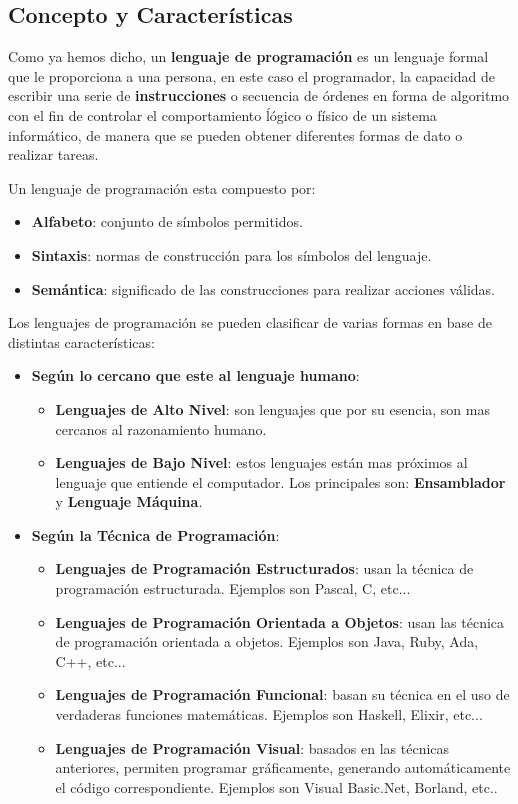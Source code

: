 \subsection{Concepto y Características}
Como ya hemos dicho, un \textbf{lenguaje de programación} es un lenguaje formal que le proporciona a una persona, en este caso el programador, la capacidad de escribir una serie de \textbf{instrucciones} o secuencia de órdenes en forma de algoritmo con el fin de controlar el comportamiento ĺógico o físico de un sistema informático, de manera que se pueden obtener diferentes formas de dato o realizar tareas. \cite{lenguaje}

Un lenguaje de programación esta compuesto por:
\begin{itemize}
    \item \textbf{Alfabeto}: conjunto de símbolos permitidos.
    \item \textbf{Sintaxis}: normas de construcción para los símbolos del lenguaje.
    \item \textbf{Semántica}: significado de las construcciones para realizar acciones válidas.
\end{itemize}

Los lenguajes de programación se pueden clasificar de varias formas en base de distintas características:

\begin{itemize}
    \item \textbf{Según lo cercano que este al lenguaje humano}:
    \begin{itemize}
        \item \textbf{Lenguajes de Alto Nivel}: son lenguajes que por su esencia, son mas cercanos al razonamiento humano.
        \item \textbf{Lenguajes de Bajo Nivel}: estos lenguajes están mas próximos al lenguaje que entiende el computador. Los principales son: \textbf{Ensamblador} y \textbf{Lenguaje Máquina}.
    \end{itemize}
    \item \textbf{Según la Técnica de Programación}:
    \begin{itemize}
        \item \textbf{Lenguajes de Programación Estructurados}: usan la técnica de programación estructurada. Ejemplos son Pascal, C, etc...
        \item \textbf{Lenguajes de Programación Orientada a Objetos}: usan las técnica de programación orientada a objetos. Ejemplos son Java, Ruby, Ada, C++, etc...
        \item \textbf{Lenguajes de Programación Funcional}: basan su técnica en el uso de verdaderas funciones matemáticas. Ejemplos son Haskell, Elixir, etc...
        \item \textbf{Lenguajes de Programación Visual}: basados en las técnicas anteriores, permiten programar gráficamente, generando automáticamente el código correspondiente. Ejemplos son Visual Basic.Net, Borland, etc..
    \end{itemize}
\end{itemize}

